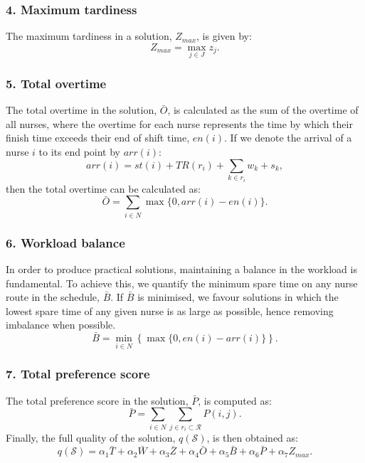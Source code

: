 \documentclass[a4paper,11pt,authoryear]{elsarticle}
\begin{document}
\subsubsection*{4. Maximum tardiness}
\noindent The maximum tardiness in a solution, $Z_{max}$, is given by:
\begin{equation}
    Z_{max} = \max_{j \in J} z_j.
\end{equation}

\subsubsection*{5. Total overtime}
\noindent The total overtime in the solution, $\bar{O}$, is calculated as the sum of the overtime of all nurses, where the overtime for each nurse represents the time by which their finish time exceeds their end of shift time, $en(i)$. If we denote the arrival of a nurse $i$ to its end point by $arr(i)$:
\begin{equation}
	arr(i) = st(i) + TR(r_i) + \sum_{k \in r_i} w_k + s_k,
\end{equation}
then the total overtime can be calculated as:
\begin{equation}
     \bar{O} = \sum_{i \in N} \max \{0, arr(i) - en(i)\}.
\end{equation}

\subsubsection*{6. Workload balance}
\noindent In order to produce practical solutions, maintaining a balance in the workload is fundamental. To achieve this, we quantify the minimum spare time on any nurse route in the schedule, $\bar{B}$. If $\bar{B}$ is minimised, we favour solutions in which the lowest spare time of any given nurse is as large as possible, hence removing imbalance when possible.
\begin{equation}
    \bar{B} = \min_{i \in N} \left\{\max \{0, en(i) - arr(i)\} \right\}.
\end{equation}

\subsubsection*{7. Total preference score}
\noindent The total preference score in the solution, $\bar{P}$, is computed as:
\begin{equation}
    \bar{P} = \sum_{i \in N} \sum_{j \in r_i \subset \mathcal{R}} P(i,j).
\end{equation}
Finally, the full quality of the solution, $q(\mathcal{S})$, is then obtained as:
\begin{equation}
    q(\mathcal{S}) = \alpha_1 \bar{T} + %
         \alpha_2 \bar{W} + %
         \alpha_3 \bar{Z} + %
         \alpha_4 \bar{O} + %
         \alpha_5 \bar{B} + %
         \alpha_6 \bar{P} + %
         \alpha_7 Z_{max}. \label{eqn:solutionquality}
\end{equation}
\end{document}
